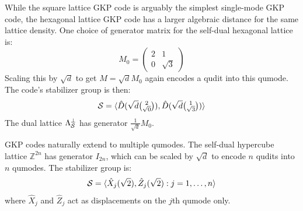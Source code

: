 \begin{example}\label{ex:hexagonal_gkp}
    While the square lattice GKP code is arguably the simplest single-mode GKP code, the hexagonal lattice GKP code has a larger algebraic distance for the same lattice density.
    One choice of generator matrix for the self-dual hexagonal lattice is:
    \begin{equation}
        M_0 = \begin{pmatrix} 2 & 1 \\ 0 & \sqrt{3} \end{pmatrix}
    \end{equation}
    Scaling this by $\sqrt{d}$ to get $M = \sqrt{d}M_0$ again encodes a qudit into this qumode.
    The code's stabilizer group is then:
    \begin{equation}
        \mathcal{S} = \langle \hat{D}(\sqrt{d}\tbinom{2}{\sqrt{0}}), \hat{D}(\sqrt{d}\tbinom{1}{\sqrt{3}}) \rangle
    \end{equation}
    The dual lattice $\Lambda_{\mathcal{S}}^\perp$ has generator $\frac{1}{\sqrt{d}}M_0$.
\end{example}

\begin{example}\label{ex:square_multimode_gkp}
    GKP codes naturally extend to multiple qumodes.
    The self-dual hypercube lattice $\mathbb{Z}^{2n}$ has generator $I_{2n}$, which can be scaled by $\sqrt{d}$ to encode $n$ qudits into $n$ qumodes.
    The stabilizer group is:
    \begin{equation}
        \mathcal{S} = \langle \hat{X}_j(\sqrt{2}), \hat{Z}_j(\sqrt{2}) : j = 1, \ldots, n \rangle
    \end{equation}
    where $\hat{X}_j$ and $\hat{Z}_j$ act as displacements on the $j$th qumode only.
\end{example}

